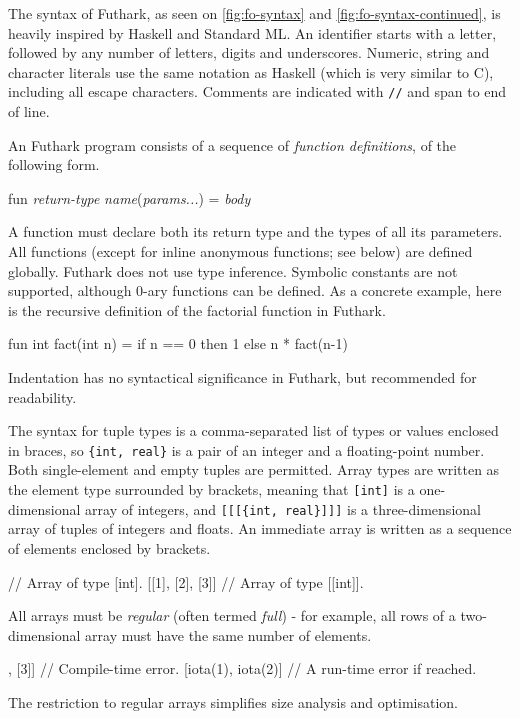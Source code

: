 \documentclass[oneside]{memoir}
\begin{document}
The syntax of Futhark, as seen on \cref{fig:fo-syntax} and
\cref{fig:fo-syntax-continued}, is heavily inspired by Haskell and
Standard ML.  An identifier starts with a letter, followed by any
number of letters, digits and underscores.  Numeric, string and
character literals use the same notation as Haskell (which is very
similar to C), including all escape characters.  Comments are
indicated with \texttt{//} and span to end of line.

An Futhark program consists of a sequence of \emph{function
  definitions}, of the following form.

\begin{colorcode}
  fun \textit{return-type} \textit{name}(\textit{params...}) = \textit{body}
\end{colorcode}

A function must declare both its return type and the types of all its
parameters.  All functions (except for inline anonymous functions; see
below) are defined globally.  Futhark does not use type inference.
Symbolic constants are not supported, although 0-ary functions can be
defined.  As a concrete example, here is the recursive definition of
the factorial function in Futhark.
\begin{colorcode}
  fun int fact(int n) =
    if n == 0 then 1
              else n * fact(n-1)
\end{colorcode}
Indentation has no syntactical significance in Futhark, but recommended for
readability.

The syntax for tuple types is a comma-separated list of types or
values enclosed in braces, so \texttt{\{int, real\}} is a pair of an
integer and a floating-point number.  Both single-element and empty
tuples are permitted.  Array types are written as the element type
surrounded by brackets, meaning that \texttt{[int]} is a
one-dimensional array of integers, and \texttt{[[[\{int, real\}]]]} is a
three-dimensional array of tuples of integers and floats.  An
immediate array is written as a sequence of elements enclosed by
brackets.
\begin{colorcode}
  [1, 2, 3]       // Array of type [int].
  [[1], [2], [3]] // Array of type [[int]].
\end{colorcode}
All arrays must be \emph{regular} (often termed \emph{full}) - for
example, all rows of a two-dimensional array must have the same number
of elements.
\begin{colorcode}
  [[1, 2], [3]]      // Compile-time error.
  [iota(1), iota(2)] // A run-time error if reached.
\end{colorcode}
The restriction to regular arrays simplifies size analysis and
optimisation.
\end{document}
